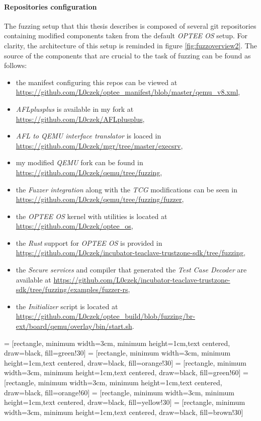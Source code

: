 \clearpage
{}

\paragraph{Repositories configuration} 
The fuzzing setup that this thesis describes is composed of several git repositories containing modified components taken from the default \textit{OPTEE OS} setup. For clarity, the architecture of this setup is reminded in figure \ref{fig:fuzzoverview2}. The source of the components that are crucial to the task of fuzzing can be found as follows:
\begin{itemize}
    \item the manifest configuring this repos can be viewed at \url{https://github.com/L0czek/optee_manifest/blob/master/qemu_v8.xml},
    \item \textit{AFLplusplus} is available in my fork at \url{https://github.com/L0czek/AFLplusplus},
    \item \textit{AFL to QEMU interface translator} is loaced in \url{https://github.com/L0czek/mgr/tree/master/execsrv},
    \item my modified \textit{QEMU} fork can be found in \url{https://github.com/L0czek/qemu/tree/fuzzing},
    \item the \textit{Fuzzer integration} along with the \textit{TCG} modifications can be seen in \url{https://github.com/L0czek/qemu/tree/fuzzing/fuzzer},
    \item the \textit{OPTEE OS} kernel with utilities is located at \url{https://github.com/L0czek/optee_os},
    \item the \textit{Rust} support for \textit{OPTEE OS} is provided in \url{https://github.com/L0czek/incubator-teaclave-trustzone-sdk/tree/fuzzing},
    \item the \textit{Secure services} and compiler that generated the \textit{Test Case Decoder} are available at \url{https://github.com/L0czek/incubator-teaclave-trustzone-sdk/tree/fuzzing/examples/fuzzer-rs},
    \item the \textit{Initializer} script is located at \url{https://github.com/L0czek/optee_build/blob/fuzzing/br-ext/board/qemu/overlay/bin/start.sh}.
\end{itemize}


 = [rectangle, minimum width=3cm, minimum height=1cm,text centered, draw=black, fill=green!30]
 = [rectangle, minimum width=3cm, minimum height=1cm,text centered, draw=black, fill=orange!30]
 = [rectangle, minimum width=3cm, minimum height=1cm,text centered, draw=black, fill=green!60]
 = [rectangle, minimum width=3cm, minimum height=1cm,text centered, draw=black, fill=orange!60]
 = [rectangle, minimum width=3cm, minimum height=1cm,text centered, draw=black, fill=yellow!30]
 = [rectangle, minimum width=3cm, minimum height=1cm,text centered, draw=black, fill=brown!30]

